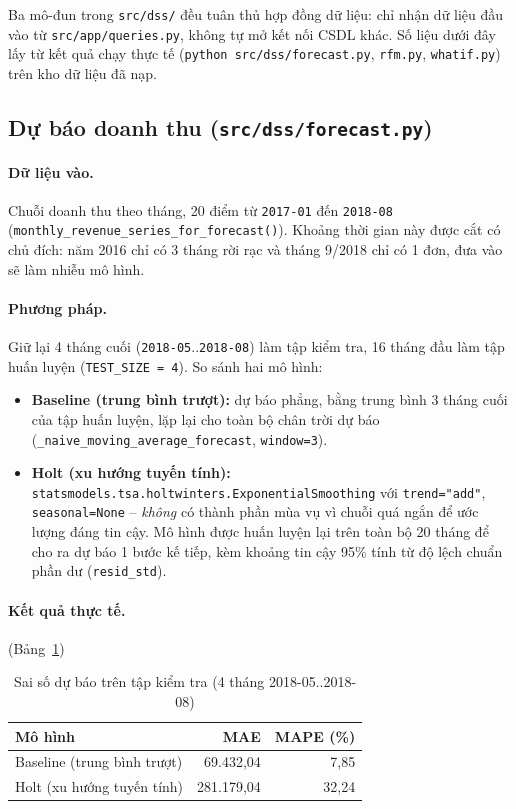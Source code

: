 \documentclass[12pt,a4paper]{article}
\newcommand{\code}[1]{\texttt{\small #1}}
\begin{document}
Ba mô-đun trong \code{src/dss/} đều tuân thủ hợp đồng dữ liệu: chỉ nhận dữ liệu đầu vào từ
\code{src/app/queries.py}, không tự mở kết nối CSDL khác. Số liệu dưới đây lấy từ kết quả chạy thực tế
(\code{python src/dss/forecast.py}, \code{rfm.py}, \code{whatif.py}) trên kho dữ liệu đã nạp.

\subsection{Dự báo doanh thu (\code{src/dss/forecast.py})}

\paragraph{Dữ liệu vào.} Chuỗi doanh thu theo tháng, 20 điểm từ \code{2017-01} đến \code{2018-08}
(\code{monthly\_revenue\_series\_for\_forecast()}). Khoảng thời gian này được cắt có chủ đích: năm 2016 chỉ
có 3 tháng rời rạc và tháng 9/2018 chỉ có 1 đơn, đưa vào sẽ làm nhiễu mô hình.

\paragraph{Phương pháp.} Giữ lại 4 tháng cuối (\code{2018-05}..\code{2018-08}) làm tập kiểm tra, 16 tháng đầu
làm tập huấn luyện (\code{TEST\_SIZE = 4}). So sánh hai mô hình:
\begin{itemize}[nosep]
  \item \textbf{Baseline (trung bình trượt):} dự báo phẳng, bằng trung bình 3 tháng cuối của tập huấn luyện,
        lặp lại cho toàn bộ chân trời dự báo (\code{\_naive\_moving\_average\_forecast}, \code{window=3}).
  \item \textbf{Holt (xu hướng tuyến tính):} \code{statsmodels.tsa.holtwinters.ExponentialSmoothing} với
        \code{trend="add"}, \code{seasonal=None} -- \emph{không} có thành phần mùa vụ vì chuỗi quá ngắn để
        ước lượng đáng tin cậy. Mô hình được huấn luyện lại trên toàn bộ 20 tháng để cho ra dự báo 1 bước kế
        tiếp, kèm khoảng tin cậy 95\% tính từ độ lệch chuẩn phần dư (\code{resid\_std}).
\end{itemize}

\paragraph{Kết quả thực tế.} (Bảng~\ref{tab:forecast-result})

\begin{table}[h]
\centering
\caption{Sai số dự báo trên tập kiểm tra (4 tháng 2018-05..2018-08)}\label{tab:forecast-result}
\small
\begin{tabular}{@{}l r r@{}}
\toprule
\textbf{Mô hình} & \textbf{MAE} & \textbf{MAPE (\%)}\\
\midrule
Baseline (trung bình trượt) & 69.432,04 & 7,85\\
Holt (xu hướng tuyến tính) & 281.179,04 & 32,24\\
\bottomrule
\end{tabular}
\end{table}
\end{document}
